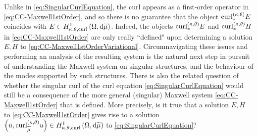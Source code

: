 Unlike in \eqref{eq:SingularCurlEquation}, the curl appears as a first-order operator in \eqref{eq:CC-Maxwell1stOrder}, and so there is no guarantee that the object $\mathrm{curl}_{*}^{\left( \kappa, \theta \right)}E$ coincides with $E\in H^1_{\kappa,\theta,\mathrm{curl}}\left( \Omega, \mathrm{d}\widetilde{\mu} \right)$.
Indeed, the objects $\mathrm{curl}_{*}^{\left( \kappa, \theta \right)}E$ and $\mathrm{curl}_{*}^{\left( \kappa, \theta \right)}H$ in \eqref{eq:CC-Maxwell1stOrder} are only really ``defined" upon determining a solution $E,H$ to \eqref{eq:CC-Maxwell1stOrderVariational}.
Circumnavigating these issues and performing an analysis of the resulting system is the natural next step in pursuit of understanding the Maxwell system on singular structures, and the behaviour of the modes supported by such structures.
There is also the related question of whether the singular curl of the curl equation \eqref{eq:SingularCurlEquation} would still be a consequence of the more general (singular) Maxwell system \eqref{eq:CC-Maxwell1stOrder} that is defined.
More precisely, is it true that a solution $E,H$ to \eqref{eq:CC-Maxwell1stOrder} gives rise to a solution $\left( u, \mathrm{curl}_{\widetilde{\mu}}^{\left( \kappa, \theta \right)}u  \right)\in H^1_{\kappa,\theta,\mathrm{curl}}\left( \Omega, \mathrm{d}\widetilde{\mu} \right)$ to \eqref{eq:SingularCurlEquation}? 